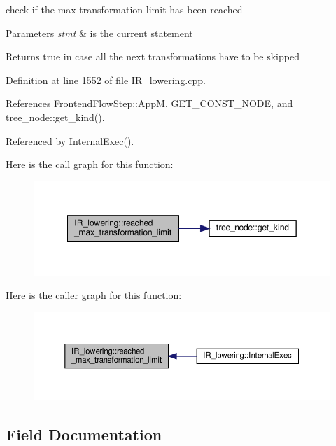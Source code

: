 check if the max transformation limit has been reached 


\begin{DoxyParams}{Parameters}
{\em stmt} & is the current statement \\
\hline
\end{DoxyParams}
\begin{DoxyReturn}{Returns}
true in case all the next transformations have to be skipped 
\end{DoxyReturn}


Definition at line 1552 of file I\+R\+\_\+lowering.\+cpp.



References Frontend\+Flow\+Step\+::\+AppM, G\+E\+T\+\_\+\+C\+O\+N\+S\+T\+\_\+\+N\+O\+DE, and tree\+\_\+node\+::get\+\_\+kind().



Referenced by Internal\+Exec().

Here is the call graph for this function\+:
\nopagebreak
\begin{figure}[H]
\begin{center}
\leavevmode
\includegraphics[width=349pt]{df/d7d/classIR__lowering_a1c9f8a152838d5330a866220393119ff_cgraph}
\end{center}
\end{figure}
Here is the caller graph for this function\+:
\nopagebreak
\begin{figure}[H]
\begin{center}
\leavevmode
\includegraphics[width=350pt]{df/d7d/classIR__lowering_a1c9f8a152838d5330a866220393119ff_icgraph}
\end{center}
\end{figure}


\subsection{Field Documentation}
\mbox{\label{classIR__lowering_a09f29d65e37fa212874e351f82c1fb54}} 

